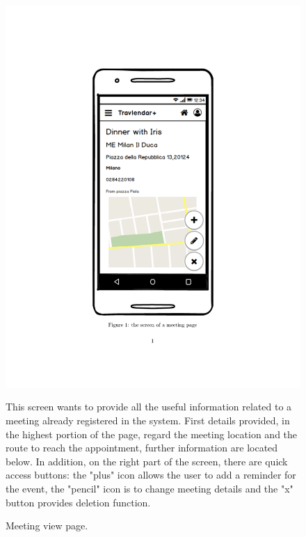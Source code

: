 	\begin{figure}
	\centering
	\includegraphics[width=0.6\linewidth]{mockups/MeetingView}
	\caption{Meeting view page. }
	\label{fig:meeting-view}
	\begin{center}
		This screen wants to provide all the useful information related to a meeting already registered in the system. First details provided, in the highest portion of the page, regard the meeting location and the route to reach the appointment, further information are located below. In addition, on the right part of the screen, there are quick access buttons: the "plus" icon allows the user to add a reminder for the event, the "pencil" icon is to change meeting details and the "x" button provides deletion function. 
	\end{center}
	\end{figure}

